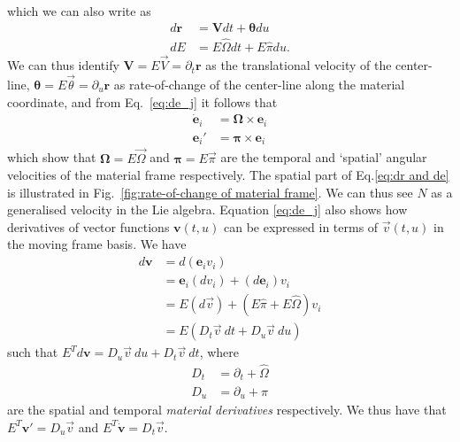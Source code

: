 which we can also write as
\begin{subequations}
\begin{align}
d \mathbf{r} & = \mathbf{V} dt + \boldsymbol{\theta} du \\
d E & = E \hat{\Omega} dt + E \hat{\pi} du. 
\end{align}
\end{subequations}
We can thus identify $\mathbf{V} = E \vec{V} = \partial_t \mathbf{r}$ as the translational velocity of the center-line, $\boldsymbol{\theta} = E \vec{\theta} = \partial_u \mathbf{r}$ as rate-of-change of the center-line along the material coordinate, and from Eq.~\ref{eq:de_j} it follows that
\begin{subequations}
\begin{align}
\dot{\mathbf{e}}_i & = \boldsymbol{\Omega} \times \mathbf{e}_i \\
\mathbf{e}_i' & = \boldsymbol{\pi} \times \mathbf{e}_i \label{eq:eom for e_i along u}
\end{align}
\end{subequations}
which show that $\boldsymbol{\Omega} = E \vec{\Omega}$ and $\boldsymbol{\pi} = E \vec{\pi}$ are the temporal and `spatial' angular velocities of the material frame respectively. The spatial part of Eq.\ref{eq:dr and de} is illustrated in Fig.~\ref{fig:rate-of-change of material frame}.  We can thus see $N$ as a generalised velocity in the Lie algebra. Equation \ref{eq:de_j} also shows how derivatives of vector functions $\mathbf{v}(t,u)$ can be expressed in terms of $\vec{v}(t,u)$ in the moving frame basis. We have
\begin{equation}
\begin{aligned}
d \mathbf{v} & = d(\mathbf{e}_i v_i) \\
& = \mathbf{e}_i (d v_i) + (d \mathbf{e}_i) v_i \\
& = E (d \vec{v}) + (E \hat{\pi} + E \hat{\Omega}) v_i \\
& = E (D_t \vec{v}\ dt + D_u \vec{v}\ du) 
\end{aligned}
\end{equation}
such that $E^T d \mathbf{v} = D_u \vec{v}\ du + D_t \vec{v}\ dt$, where
\begin{subequations} \label{eq:covariant derivatives}
\begin{align}
D_t & = \partial_t + \hat{\Omega}  \\
D_u & = \partial_u + \hat{\pi} 
\end{align}
\end{subequations}
are the spatial and temporal \textit{material derivatives} respectively. We thus have that $E^T \mathbf{v}' = D_u \vec{v}$  and $E^T \dot{\mathbf{v}} = D_t \vec{v}$.

